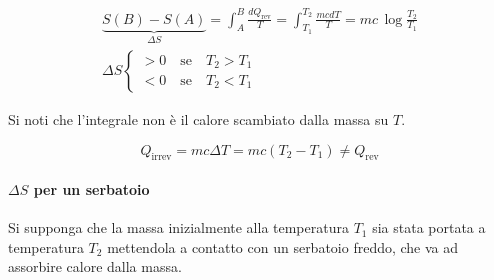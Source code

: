 \begin{gather*}
	\underbrace{S(B) - S(A)}_{\Delta S} = \int_A^B \frac{dQ_{\text{rev} } }{T} = \int_{T_1 }^{T_2 } \frac{mcdT}{T} = mc\,\log \frac{T_2 }{T_1 } \\
	\Delta S \left\{ \begin{array}{r}
		>0 \quad \text{se} \quad T_2>T_1 \\
		<0 \quad \text{se} \quad T_2<T_1
	\end{array} \right.
\end{gather*}

Si noti che l'integrale non è il calore scambiato dalla massa su $T$.

\[
	Q_{\text{irrev}} = mc\Delta T = mc(T_2-T_1) \neq Q_{\text{rev}}
\]

\paragraph{$\Delta S$ per un serbatoio} Si supponga che la massa inizialmente alla temperatura $T_1$ sia stata portata a temperatura $T_2$ mettendola a contatto con un serbatoio freddo, che va ad assorbire calore dalla massa.

